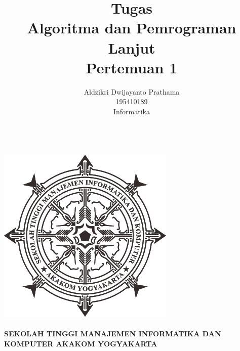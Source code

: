 \documentclass[a4paper,12pt]{article}
\begin{document}
\title{ {\Large Tugas}\\ Algoritma dan Pemrograman Lanjut\\{\Large Pertemuan 1}}

\author{Aldzikri Dwijayanto Prathama 
	\\195410189
	\\Informatika}
\makeatletter
\begin{titlepage}
	\begin{center}
		{\huge \bfseries \@title }\\[14ex]
		\includegraphics[scale=.8]{logo}\\[4ex]
		{\large \@author}\\[12ex]
		{\large \bfseries {SEKOLAH TINGGI MANAJEMEN INFORMATIKA DAN KOMPUTER
				AKAKOM YOGYAKARTA}}
	\end{center}


\end{titlepage}
\makeatother
\newpage
\end{document}

